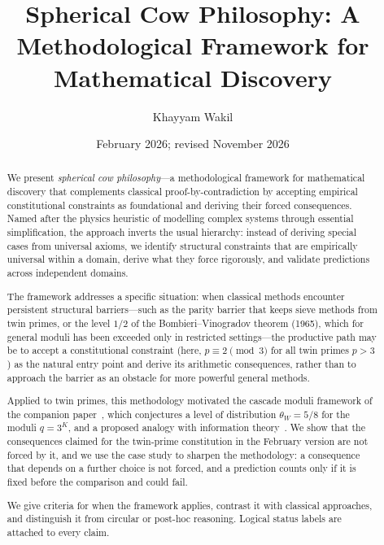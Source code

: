 \documentclass[12pt]{amsart}
\title[Spherical Cow Philosophy]{Spherical Cow Philosophy:
  A Methodological Framework for Mathematical Discovery}
\author{Khayyam Wakil}
\date{February 2026; revised November 2026}
\theoremstyle{plain}
\theoremstyle{definition}
\theoremstyle{remark}
\begin{document}
\begin{abstract}
We present \emph{spherical cow philosophy}---a methodological framework for
mathematical discovery that complements classical proof-by-contradiction by
accepting empirical constitutional constraints as foundational and deriving their
forced consequences. Named after the physics heuristic of modelling complex
systems through essential simplification, the approach inverts the usual
hierarchy: instead of deriving special cases from universal axioms, we identify
structural constraints that are empirically universal within a domain, derive
what they force rigorously, and validate predictions across independent domains.

The framework addresses a specific situation: when classical methods encounter
persistent structural barriers---such as the parity barrier that keeps sieve
methods from twin primes, or the level $1/2$ of the Bombieri--Vinogradov
theorem (1965), which for general moduli has been exceeded only in restricted
settings---the productive path may be to accept a constitutional constraint
(here, $p \equiv 2 \pmod{3}$ for all twin primes $p > 3$) as the natural entry
point and derive its arithmetic consequences, rather than to approach the
barrier as an obstacle for more powerful general methods.

Applied to twin primes, this methodology motivated the cascade moduli framework
of the companion paper~\cite{WakilEisenstein}, which conjectures a level of
distribution $\theta_W = 5/8$ for the moduli $q = 3^K$, and a proposed analogy
with information theory~\cite{WakilShannon}. We show that the consequences
claimed for the twin-prime constitution in the February version are not forced
by it, and we use the case study to sharpen the methodology: a consequence that
depends on a further choice is not forced, and a prediction counts only if it is
fixed before the comparison and could fail.

We give criteria for when the framework applies, contrast it with classical
approaches, and distinguish it from circular or post-hoc reasoning. Logical
status labels are attached to every claim.
\end{abstract}

\maketitle
\end{document}
